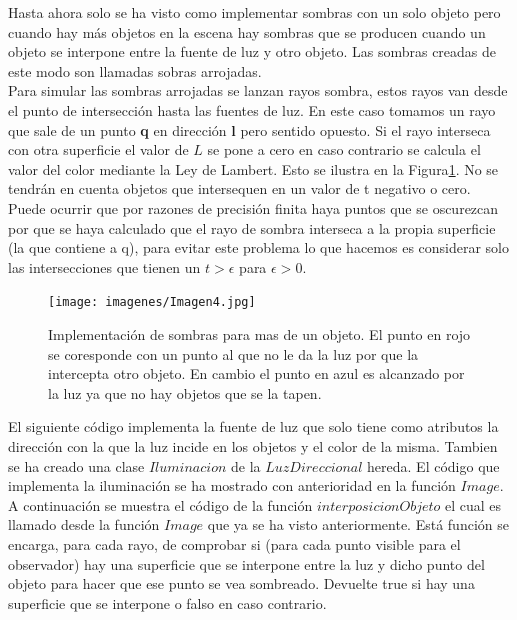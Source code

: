 Hasta ahora solo se ha visto como implementar sombras con un solo objeto pero cuando hay más objetos en la escena hay sombras que se producen cuando un objeto se interpone entre la fuente de luz y otro objeto. Las sombras creadas de este modo son llamadas sobras arrojadas.
	${ }$\\	
	
Para simular las sombras arrojadas se lanzan rayos sombra, estos rayos van desde el punto de intersección hasta las fuentes de luz. En este caso tomamos un rayo que sale de un punto \textbf{q} en dirección \textbf{l} pero sentido opuesto. Si el rayo interseca con otra superficie el valor de $L$ se pone a cero en caso contrario se calcula el valor del color mediante la Ley de Lambert. Esto se ilustra en la Figura\ref{fig:etiq_6}. No se tendrán en cuenta objetos que intersequen en un valor de t negativo o cero.
	${ }$\\	
	
Puede ocurrir que por razones de precisión finita haya puntos que se oscurezcan por que se haya calculado que el rayo de sombra interseca a la propia superficie (la que contiene a q), para evitar este problema lo que hacemos es considerar solo las intersecciones que tienen un $t > \epsilon$ para $\epsilon > 0 $.
	${ }$\\	

\begin{figure}[h]
	\begin{center}
		\texttt{[image: imagenes/Imagen4.jpg]}
	\end{center}
	\caption{Implementación de sombras para mas de un objeto. El punto en rojo se coresponde con un punto al que no le da la luz por que la intercepta otro objeto. En cambio el punto en azul es alcanzado por la luz ya que no hay objetos que se la tapen.}
	\label{fig:etiq_6}
\end{figure}

El siguiente código implementa la fuente de luz que solo tiene como atributos la dirección con la que la luz incide en los objetos y el color de la misma. Tambien se ha creado una clase $Iluminacion$ de la $LuzDireccional$ hereda. El código que implementa la iluminación se ha mostrado con anterioridad en la función $Image$. A continuación se muestra el código de la función $interposicionObjeto$ el cual es llamado desde la función $Image$ que ya se ha visto anteriormente. Está función se encarga, para cada rayo, de comprobar si (para cada punto visible para el observador) hay una superficie que se interpone entre la luz y dicho punto del objeto para hacer que ese punto se vea sombreado. Devuelte true si hay una superficie que se interpone o falso en caso contrario.
	${ }$\\



